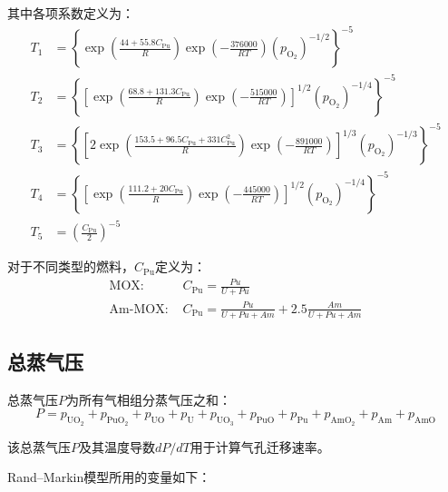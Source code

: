 其中各项系数定义为：
\begin{equation}
\begin{aligned}
	T_1 &= \left\{ \exp\left( \frac{44 + 55.8 C_{\text{Pu}}}{R} \right) \exp\left( -\frac{376000}{RT} \right) (p_{\text{O}_2})^{-1/2} \right\}^{-5} \\
	T_2 &= \left\{ \left[ \exp\left( \frac{68.8 + 131.3 C_{\text{Pu}}}{R} \right) \exp\left( -\frac{515000}{RT} \right) \right]^{1/2} (p_{\text{O}_2})^{-1/4} \right\}^{-5} \\
	T_3 &= \left\{ \left[ 2 \exp\left( \frac{153.5 + 96.5 C_{\text{Pu}} + 331 C_{\text{Pu}}^2}{R} \right) \exp\left( -\frac{891000}{RT} \right) \right]^{1/3} (p_{\text{O}_2})^{-1/3} \right\}^{-5} \\
	T_4 &= \left\{ \left[ \exp\left( \frac{111.2 + 20 C_{\text{Pu}}}{R} \right) \exp\left( -\frac{445000}{RT} \right) \right]^{1/2} (p_{\text{O}_2})^{-1/4} \right\}^{-5} \\
	T_5 &= \left( \frac{C_{\text{Pu}}}{2} \right)^{-5}
\end{aligned}
\label{eq:app_b_oxygen_pressure_auxiliary_terms}
\end{equation}

对于不同类型的燃料，$C_{\text{Pu}}$定义为：
\begin{equation}
\begin{aligned}
	\text{MOX: } & C_{\text{Pu}} = \frac{Pu}{U + Pu} \\
	\text{Am-MOX: } & C_{\text{Pu}} = \frac{Pu}{U + Pu + Am} + 2.5 \frac{Am}{U + Pu + Am}
\end{aligned}
\label{eq:app_b_plutonium_concentration_definition}
\end{equation}

\subsection{总蒸气压}

总蒸气压$P$为所有气相组分蒸气压之和：
\begin{equation}
P = p_{\text{UO}_2} + p_{\text{PuO}_2} + p_{\text{UO}} + p_{\text{U}} + p_{\text{UO}_3} + p_{\text{PuO}} + p_{\text{Pu}} + p_{\text{AmO}_2} + p_{\text{Am}} + p_{\text{AmO}}
\label{eq:app_b_total_vapor_pressure}
\end{equation}

该总蒸气压$P$及其温度导数$dP/dT$用于计算气孔迁移速率。

Rand--Markin模型所用的变量如下：

